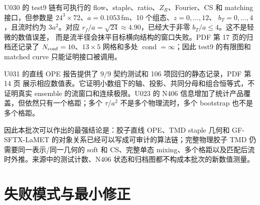 U030 的 test9 链有可执行的 flow、staple、ratio、\(Z_R\)、Fourier、CS 和 matching
接口，但参数是 \(24^3\times72\)、\(a=0.1053\,\)fm、10 个组态、\(z=0,\ldots,12\)、
\(b_T=0,\ldots,4\)，且流时约为 \(3a^2\)。对应
\(r_f/a=\sqrt{24}\approx4.90\)，已经大于非零 \(b_T/a\le4\)。这不是轻微的数值误差，
而是流半径会抹平目标横向结构的窗口失败。PDF 第 17 页的归档还记录了
\(N_{\rm conf}=10\)、\(13\times5\) 网格和多处 \(\operatorname{cond}=\infty\)；因此 test9 的有限图和
matched curve 只能证明接口被调用。

U031 的直线 OPE 报告提供了 \(9/9\) 契约测试和 106 项回归的静态记录，PDF 第 14 页
展示相应数值表。它证明小数组下的轴、投影、共同分母和组合恒等式，不证明真实 ensemble
的流窗口和连续极限。U023 的 N406 信息增加了统计产品覆盖，但依然只有一个格距；多个
\(\tau/a^2\) 不是多个物理流时，多个 bootstrap 也不是多个格距。

因此本批次可以作出的最强结论是：胶子直线 OPE、TMD staple 几何和 GF-SFTX-LaMET
的对象关系已经可以写成可审计的算法链；完整物理胶子 TMD 仍需要同一表示/同一几何的
soft 和 CS、完整单态 mixing、多个格距以及匹配后流时外推。来源中的测试计数、N406
状态和归档图都不构成本批次的新数值测量。

\section{失败模式与最小修正}

